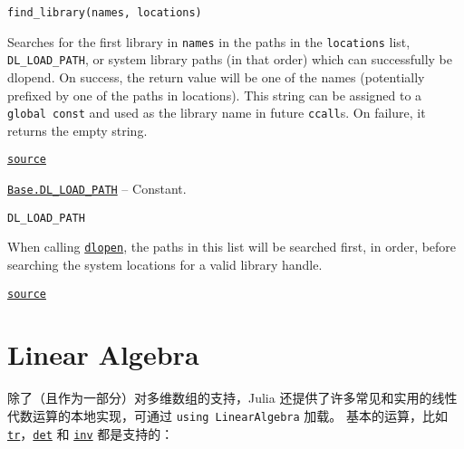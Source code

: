 \begin{adjustwidth}{2em}{0pt}


\begin{verbatim}
find_library(names, locations)
\end{verbatim}

Searches for the first library in \texttt{names} in the paths in the \texttt{locations} list, \texttt{DL\_LOAD\_PATH}, or system library paths (in that order) which can successfully be dlopen{\textquotesingle}d. On success, the return value will be one of the names (potentially prefixed by one of the paths in locations). This string can be assigned to a \texttt{global const} and used as the library name in future \texttt{ccall}{\textquotesingle}s. On failure, it returns the empty string.



\href{https://github.com/JuliaLang/julia/blob/9058264a69f9efc1af805c4473c946f87859b731/base/libdl.jl#L184-L192}{\texttt{source}}


\end{adjustwidth}
\hypertarget{617000259211246203}{}
\hyperlink{617000259211246203}{\texttt{Base.DL\_LOAD\_PATH}}  -- {Constant.}

\begin{adjustwidth}{2em}{0pt}


\begin{verbatim}
DL_LOAD_PATH
\end{verbatim}

When calling \hyperlink{13488184288681759423}{\texttt{dlopen}}, the paths in this list will be searched first, in order, before searching the system locations for a valid library handle.



\href{https://github.com/JuliaLang/julia/blob/9058264a69f9efc1af805c4473c946f87859b731/base/libdl.jl#L14-L19}{\texttt{source}}


\end{adjustwidth}

\hypertarget{16458019208269775945}{}


\chapter{Linear Algebra}





除了（且作为一部分）对多维数组的支持，Julia 还提供了许多常见和实用的线性代数运算的本地实现，可通过 \texttt{using LinearAlgebra} 加载。 基本的运算，比如 \hyperlink{3355659645971312171}{\texttt{tr}}，\hyperlink{16543378577000914469}{\texttt{det}} 和 \hyperlink{13336866048543706848}{\texttt{inv}} 都是支持的：




